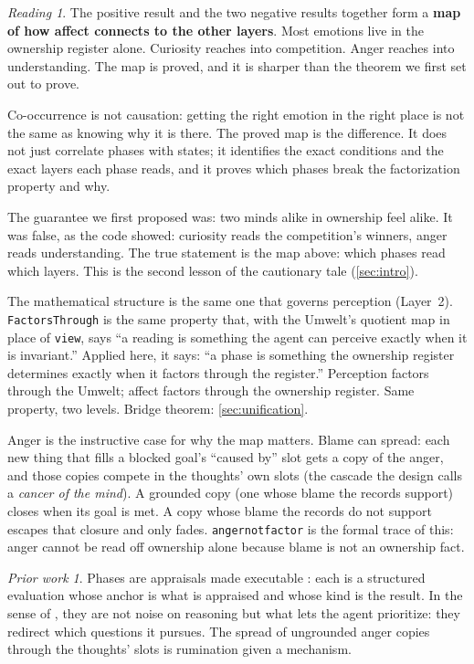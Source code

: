 \documentclass[11pt]{article}
\newcommand{\leanus}{\textunderscore\allowbreak}
\newcommand{\lean}[1]{{\let\_\leanus\texttt{#1}}}
\theoremstyle{remark}
\newtheorem*{reading}{Reading}
\newtheorem*{prior}{Prior work}
\begin{document}
\begin{reading}
The positive result and the two negative results together form a \textbf{map of how
affect connects to the other layers}. Most emotions live in the ownership register alone.
Curiosity reaches into competition. Anger reaches into understanding. The map is proved,
and it is sharper than the theorem we first set out to prove.

Co-occurrence is not causation: getting the right emotion in the right place is not the
same as knowing why it is there. The proved map is the difference. It does not just
correlate phases with states; it identifies the exact conditions and the exact layers each
phase reads, and it proves which phases break the factorization property and why.

The guarantee we first proposed was: two minds alike in ownership feel alike. It was false,
as the code showed: curiosity reads the competition's winners, anger reads understanding.
The true statement is the map above: which phases read which layers. This is the second
lesson of the cautionary tale (\cref{sec:intro}).

The mathematical structure is the same one that governs perception (Layer~2).
\lean{FactorsThrough} is the same property that, with the Umwelt's quotient map in place
of \lean{view}, says ``a reading is something the agent can perceive exactly when it is
invariant.'' Applied here, it says: ``a phase is something the ownership register
determines exactly when it factors through the register.'' Perception factors through the
Umwelt; affect factors through the ownership register. Same property, two levels. Bridge
theorem: \cref{sec:unification}.

Anger is the instructive case for why the map matters. Blame can spread: each new thing
that fills a blocked goal's ``caused by'' slot gets a copy of the anger, and those copies
compete in the thoughts' own slots (the cascade the design calls a \emph{cancer of the
mind}). A grounded copy (one whose blame the records support) closes when its goal is met.
A copy whose blame the records do not support escapes that closure and only fades.
\lean{anger\_not\_factor} is the formal trace of this: anger cannot be read off ownership
alone because blame is not an ownership fact.
\end{reading}

\begin{prior}
Phases are appraisals made executable \citep{Lazarus1991,Scherer2001}: each is a structured
evaluation whose anchor is what is appraised and whose kind is the result. In the sense of
\citet{Damasio1994}, they are not noise on reasoning but what lets the agent prioritize: they
redirect which questions it pursues. The spread of ungrounded anger copies through the
thoughts' slots is rumination \citep{NolenHoeksema1991} given a mechanism.
\end{prior}
\end{document}
